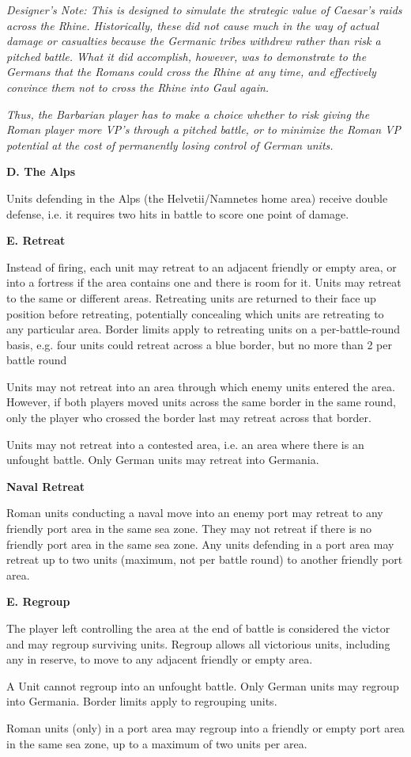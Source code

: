 \textit{Designer's Note: This is designed to simulate the strategic value of Caesar's raids across the Rhine. Historically, these did not cause much in the way of actual damage or casualties because the Germanic tribes withdrew rather than risk a pitched battle. What it did accomplish, however, was to demonstrate to the Germans that the Romans could cross the Rhine at any time, and effectively convince them not to cross the Rhine into Gaul again.}
\par
\textit{Thus, the Barbarian player has to make a choice whether to risk giving the Roman player more VP's through a pitched battle, or to minimize the Roman VP potential at the cost of permanently losing control of German units.}

\textbf{D. The Alps}
\par
Units defending in the Alps (the Helvetii/Namnetes home area) receive double defense, i.e. it requires two hits in battle to score one point of damage.

\textbf{E. Retreat}
\par
Instead of firing, each unit may retreat to an adjacent friendly or empty area, or into a fortress if the area contains one and there is room for it. Units may retreat to the same or different areas. Retreating units are returned to their face up position before retreating, potentially concealing which units are retreating to any particular area. Border limits apply to retreating units on a per-battle-round basis, e.g. four units could retreat across a blue border, but no more than 2 per battle round

Units may not retreat into an area through which enemy units entered the area. However, if both players moved units across the same border in the same round, only the player who crossed the border last may retreat across that border.

Units may not retreat into a contested area, i.e. an area where there is an unfought battle. Only German units may retreat into Germania.

\textbf{Naval Retreat}
\par
Roman units conducting a naval move into an enemy port may retreat to any friendly port area in the same sea zone. They may not retreat if there is no friendly port area in the same sea zone. Any units defending in a port area may retreat up to two units (maximum, not per battle round) to another friendly port area.

\textbf{E. Regroup}
\par
The player left controlling the area at the end of battle is considered the victor and may regroup surviving units. Regroup allows all victorious units, including any in reserve, to move to any adjacent friendly or empty area.

A Unit cannot regroup into an unfought battle. Only German units may regroup into Germania. Border limits apply to regrouping units.

Roman units (only) in a port area may regroup into a friendly or empty port area in the same sea zone, up to a maximum of two units per area.